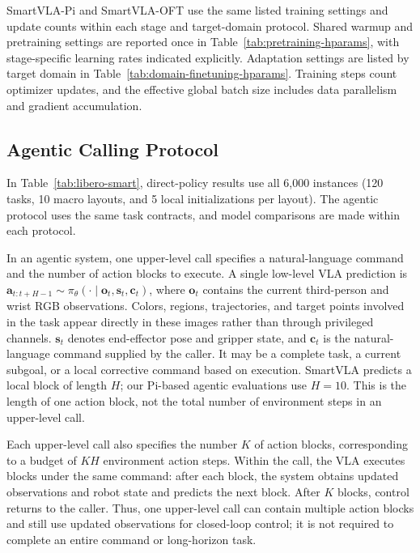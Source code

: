 SmartVLA-Pi and SmartVLA-OFT use the same listed training settings and update
counts within each stage and target-domain protocol. Shared warmup and pretraining
settings are reported once in Table~\ref{tab:pretraining-hparams}, with
stage-specific learning rates indicated explicitly. Adaptation settings are
listed by target domain in Table~\ref{tab:domain-finetuning-hparams}.
Training steps count optimizer updates, and the effective global batch size
includes data parallelism and gradient accumulation.

%

%

\hypertarget{agentic-calling-protocol}{%
\subsection{Agentic Calling
Protocol}\label{agentic-calling-protocol}}

In Table~\ref{tab:libero-smart}, direct-policy results use all 6,000
instances (120 tasks, 10 macro layouts, and 5 local initializations per
layout). The agentic protocol uses the same task contracts, and model
comparisons are made within each protocol.

In an agentic system, one upper-level call specifies a natural-language
command and the number of action blocks to execute. A single low-level
VLA prediction is \(\mathbf{a}_{t:t+H-1} \sim \pi_\theta(\cdot \mid
\mathbf{o}_t,\mathbf{s}_t,\mathbf{c}_t)\),
where \(\mathbf{o}_t\) contains the current third-person and wrist RGB
observations. Colors, regions, trajectories, and target points involved
in the task appear directly in these images rather than through
privileged channels. \(\mathbf{s}_t\) denotes end-effector pose and
gripper state, and \(\mathbf{c}_t\) is the natural-language command
supplied by the caller. It may be a complete task, a current subgoal, or
a local corrective command based on execution. SmartVLA predicts a local
block of length \(H\); our Pi-based agentic evaluations use \(H=10\). This is the length of one
action
block, not the total number of environment steps in an upper-level call.

Each upper-level call also specifies the number \(K\) of action blocks,
corresponding to a budget of \(KH\) environment action steps. Within the
call, the VLA executes blocks under the same command: after each block,
the system obtains updated observations and robot state and predicts the
next block. After \(K\) blocks, control returns to the caller. Thus, one
upper-level call can contain multiple action blocks and still use
updated observations for closed-loop control; it is not required to
complete an entire command or long-horizon task.

